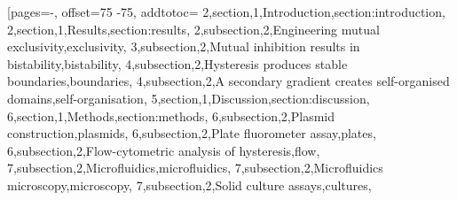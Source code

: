[pages=-, offset=75 -75, addtotoc={
        2,section,1,Introduction,section:introduction,
        2,section,1,Results,section:results,
        2,subsection,2,Engineering mutual exclusivity,exclusivity,
        3,subsection,2,Mutual inhibition results in bistability,bistability,
        4,subsection,2,Hysteresis produces stable boundaries,boundaries,
        4,subsection,2,A secondary gradient creates self-organised domains,self-organisation,
        5,section,1,Discussion,section:discussion,
        6,section,1,Methods,section:methods,
        6,subsection,2,Plasmid construction,plasmids,
        6,subsection,2,Plate fluorometer assay,plates,
        6,subsection,2,Flow-cytometric analysis of hysteresis,flow,
        7,subsection,2,Microfluidics,microfluidics,
        7,subsection,2,Microfluidics microscopy,microscopy,
        7,subsection,2,Solid culture assays,cultures},
